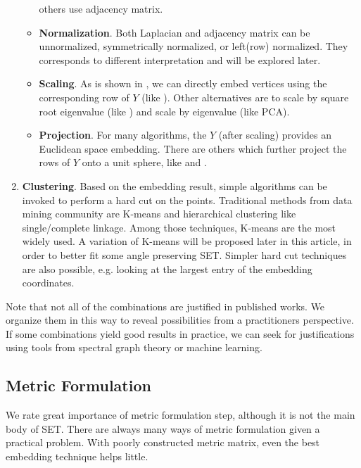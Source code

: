 \begin{enumerate}
\begin{itemize}
					others use \cite{ng2002spectral,brand2003unifying,kannan2004clusterings}
					adjacency matrix. 
				\item \textbf{Normalization}. Both Laplacian and 
					adjacency matrix can be unnormalized, symmetrically normalized, 
					or left(row) normalized\cite{von2007tutorial}. They corresponds to 
					different interpretation and will be explored later. 
				\item \textbf{Scaling}. 
					As is shown in \ralg{\ref{alg:sc_sample}}, we can directly 
					embed vertices using the corresponding row of $Y$
					(like \cite{ng2002spectral}). Other alternatives 
					are to scale by square root eigenvalue (like \cite{brand2003unifying})
					and scale by eigenvalue (like PCA\cite{bishop2006pattern}). 
				\item \textbf{Projection}. For many algorithms, the $Y$ 
					(after scaling) provides an Euclidean space embedding. 
					There are others which further project the rows of $Y$
					onto a unit sphere, like \cite{ng2002spectral} and
					\cite{brand2003unifying}. 
			\end{itemize}
	\item \textbf{Clustering}. 
		Based on the embedding result, simple algorithms can be invoked to 
		perform a hard cut on the points. Traditional methods from data mining
		community are K-means and hierarchical clustering like single/complete
		linkage\cite{jiawei2001data}. Among those techniques, K-means are the most 
		widely used. A variation of K-means will be proposed later in this article,
		in order to better fit some angle preserving SET. Simpler 
		hard cut techniques are also possible, e.g. looking at the largest entry 
		of the embedding coordinates\cite{kannan2004clusterings}.  
\end{enumerate}

Note that not all of the combinations are justified in published works. 
We organize them in this way to reveal possibilities from a practitioners
perspective. If some combinations yield good results in practice, we can 
seek for justifications using tools from spectral graph theory or machine learning. 


\subsection{Metric Formulation}

We rate great importance of metric formulation step, 
although it is not the main body of SET. 
There are always many ways of metric formulation
given a practical problem. With poorly constructed 
metric matrix, even the best embedding technique helps little.  

